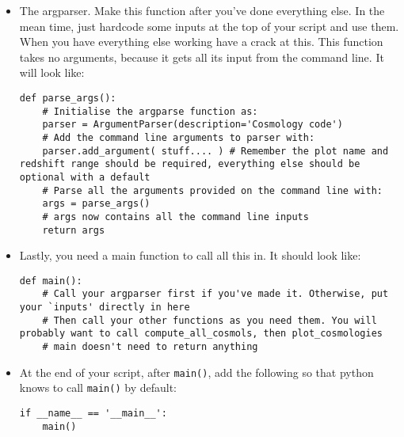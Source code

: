 \documentclass[]{article}
\begin{document}
\begin{itemize}
\item The argparser. Make this function after you've done everything else. In the mean time, just hardcode some inputs at the top of your script and use them. When you have everything else working have a crack at this. This function takes no arguments, because it gets all its input from the command line. It will look like:
\begin{lstlisting}
def parse_args():
    # Initialise the argparse function as:
    parser = ArgumentParser(description='Cosmology code')
    # Add the command line arguments to parser with: 
    parser.add_argument( stuff.... ) # Remember the plot name and redshift range should be required, everything else should be optional with a default
    # Parse all the arguments provided on the command line with:
    args = parse_args()
    # args now contains all the command line inputs
    return args
\end{lstlisting}

\item Lastly, you need a main function to call all this in. It should look like:
\begin{lstlisting}
def main():
    # Call your argparser first if you've made it. Otherwise, put your `inputs' directly in here
    # Then call your other functions as you need them. You will probably want to call compute_all_cosmols, then plot_cosmologies
    # main doesn't need to return anything
\end{lstlisting}

\item At the end of your script, after \texttt{main()}, add the following so that python knows to call \texttt{main()} by default:
\begin{lstlisting}
if __name__ == '__main__':
    main()
\end{lstlisting}

\end{itemize}
\end{document}
